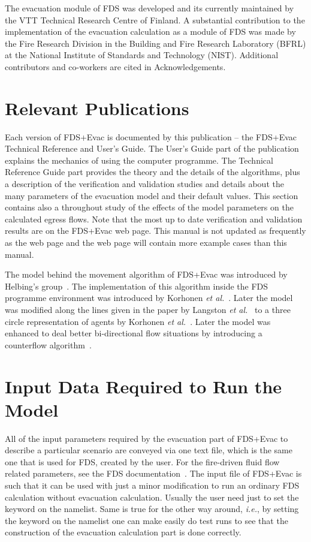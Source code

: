 \documentclass[12pt,a4paper,final,twoside]{stylevk}
\begin{document}
\noindent The evacuation module of FDS was developed and its currently
maintained by the VTT Technical Research Centre of Finland.  A
substantial contribution to the implementation of the evacuation
calculation as a module of FDS was made by the Fire Research Division
in the Building and Fire Research Laboratory (BFRL) at the National
Institute of Standards and Technology (NIST).  Additional contributors
and co-workers are cited in Acknowledgements.


\section{Relevant Publications}

\noindent Each version of FDS+Evac is documented by this publication
-- the FDS+Evac Technical Reference and User's Guide.  The User's
Guide part of the publication explains the mechanics of using the
computer programme.  The Technical Reference Guide part provides the
theory and the details of the algorithms, plus a description of the
verification and validation studies and details about the many
parameters of the evacuation model and their default values.  This
section contains also a throughout study of the effects of the model
parameters on the calculated egress flows.  Note that the most up to
date verification and validation results are on the FDS+Evac web page.
This manual is not updated as frequently as the web page and the web
page will contain more example cases than this manual.


The model behind the movement algorithm of FDS+Evac was introduced by
Helbing's group~\cite{Helbing95,Helbing00,Helbing02,Werner03}.  The
implementation of this algorithm inside the FDS programme environment
was introduced by Korhonen \emph{et al.}~\cite{Korhonen05}.  Later the
model was modified along the lines given in the paper by Langston
\emph{et al.}~\cite{Langston06} to a three circle representation of
agents by Korhonen \emph{et al.}~\cite{Korhonen07a, Korhonen07b,
  Korhonen08a, Korhonen08b}.  Later the model was enhanced to deal
better bi-directional flow situations by introducing a counterflow
algorithm~\cite{Heliovaara12}.


\section{Input Data Required to Run the Model}

\noindent All of the input parameters required by the evacuation part
of FDS+Evac to describe a particular scenario are conveyed via one
text file, which is the same one that is used for FDS, created by the
user.  For the fire-driven fluid flow related parameters, see the FDS
documentation~\cite{FDS_UserGuide}.  The input file of FDS+Evac is
such that it can be used with just a minor modification to run an
ordinary FDS calculation without evacuation calculation.  Usually the
user need just to set the keyword  on the
 namelist.  Same is true for the other way around,
\emph{i.e.}, by setting the keyword 
on the  namelist one can make easily do test runs to see
that the construction of the evacuation calculation part is done
correctly.
\end{document}
